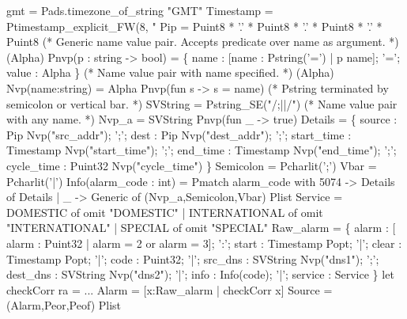  gmt = Pads.timezone\_of\_string "GMT"
\mbox{}
 Timestamp = Ptimestamp\_explicit\_FW(8, "%
 Pip = Puint8 * '.' * Puint8 * '.' * Puint8 * '.' * Puint8
\mbox{}
(* Generic name value pair. Accepts predicate over name as argument. *)
 (Alpha) Pnvp(p : string -> bool) =
      \{ name : [name : Pstring('=') | p name]; 
        '='; 
        value : Alpha \}
\mbox{}
(* Name value pair with name specified. *)
 (Alpha) Nvp(name:string) = Alpha Pnvp(fun s -> s = name)
\mbox{}
(* Pstring terminated by semicolon or vertical bar. *)
 SVString = Pstring\_SE("/;|\cdbackslash\cdbackslash|/")
\mbox{}
(* Name value pair with any name. *)
 Nvp\_a = SVString Pnvp(fun \_ -> true)
\mbox{}
 Details = \{
      source      : Pip Nvp("src\_addr");
';';  dest        : Pip Nvp("dest\_addr");
';';  start\_time  : Timestamp Nvp("start\_time");
';';  end\_time    : Timestamp Nvp("end\_time");
';';  cycle\_time  : Puint32 Nvp("cycle\_time")
\}
\mbox{}
 Semicolon = Pcharlit(';')
 Vbar = Pcharlit('|')
\mbox{}
 Info(alarm\_code : int) =
  Pmatch alarm\_code with
    5074 -> Details of Details
  | \_    -> Generic of (Nvp\_a,Semicolon,Vbar) Plist
\mbox{}
 Service = 
    DOMESTIC      of omit "DOMESTIC" 
  | INTERNATIONAL of omit "INTERNATIONAL" 
  | SPECIAL       of omit "SPECIAL"
\mbox{}
 Raw\_alarm = \{
       alarm     : [ alarm : Puint32 | alarm = 2 or alarm = 3];
 ':';  start     : Timestamp Popt;
 '|';  clear     : Timestamp Popt;
 '|';  code      : Puint32;
 '|';  src\_dns  : SVString Nvp("dns1");
 ';';  dest\_dns : SVString Nvp("dns2");
 '|';  info      : Info(code);
 '|';  service   : Service
\}
\mbox{}
let checkCorr ra = ...
\mbox{}
 Alarm = [x:Raw\_alarm | checkCorr x]
\mbox{}
 Source = (Alarm,Peor,Peof) Plist
